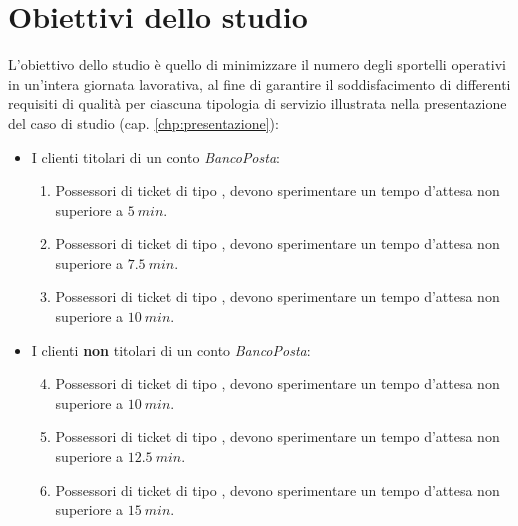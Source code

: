 \chapter{Obiettivi dello studio}\label{chp:obiettivi}
L'obiettivo dello studio è quello di minimizzare il numero degli sportelli operativi in un'intera giornata lavorativa, al fine di garantire il soddisfacimento di differenti requisiti di qualità per ciascuna tipologia di servizio illustrata nella presentazione del caso di studio (cap. \ref{chp:presentazione}):

\begin{itemize}
\item I clienti titolari di un conto \textsl{BancoPosta}:
\begin{enumerate}[label=QoS-\arabic*), align=left, leftmargin=*]
\item Possessori di ticket di tipo \uo{}, devono sperimentare un tempo d'attesa non superiore a $5\ min$.
\item Possessori di ticket di tipo \pp{}, devono sperimentare un tempo d'attesa non superiore a $7.5\ min$.
\item Possessori di ticket di tipo \sr{}, devono sperimentare un tempo d'attesa non superiore a $10\ min$.
\end{enumerate}
\item I clienti \textbf{non} titolari di un conto \textsl{BancoPosta}:
\begin{enumerate}[label=QoS-\arabic*), align=left, leftmargin=*]
\setcounter{enumi}{3}
\item Possessori di ticket di tipo \uo{}, devono sperimentare un tempo d'attesa non superiore a $10\ min$.
\item Possessori di ticket di tipo \pp{}, devono sperimentare un tempo d'attesa non superiore a $12.5\ min$.
\item Possessori di ticket di tipo \sr{}, devono sperimentare un tempo d'attesa non superiore a $15\ min$.
\end{enumerate}
\end{itemize}